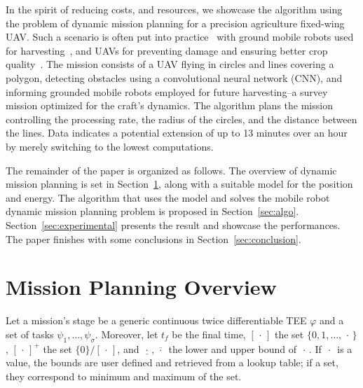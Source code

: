 \documentclass[letterpaper,10pt,conference]{ieeeconf}
\theoremstyle{definition}
\begin{document}
In the spirit of reducing costs, and resources, we showcase the algorithm using the problem of dynamic mission planning for a precision agriculture fixed-wing UAV. Such a scenario is often put into practice~\cite{hajjaj2014review} with ground mobile robots used for harvesting~\cite{qingchun2012study,dong2011development, de2011design, aljanobi2010setup, li2008analysis, edan2000robotic}, and UAVs for preventing damage and ensuring better crop quality~\cite{puri2017agriculture, daponte2019review}. The mission consists of a UAV flying in circles and lines covering a polygon, detecting obstacles using a convolutional neural network (CNN), and informing grounded mobile robots employed for future harvesting--a survey mission optimized for the craft's dynamics. The algorithm plans the mission controlling the processing rate, the radius of the circles, and the distance between the lines. Data indicates a potential extension of up to 13 minutes over an hour by merely switching to the lowest computations.

The remainder of the paper is organized as follows. The overview of dynamic mission planning is set in Section~\ref{sec:prob}, along with a suitable model for the position and energy. The algorithm that uses the model and solves the mobile robot dynamic mission planning problem is proposed in Section~\ref{sec:algo}. Section~\ref{sec:experimental} presents the result and showcase the performances. The paper finishes with some conclusions in Section~\ref{sec:conclusion}.


\section{Mission Planning Overview}
\label{sec:prob}

Let a mission's stage be a generic continuous twice differentiable TEE $\varphi$ and a set of tasks $\psi_1,\dots,\psi_{\sigma}$. Moreover, let $t_f$ be the final time, $[\,\cdot\,]$ the set $\{0,1,\dots,\,\cdot\,\}$, $[\,\cdot\,]^+$ the set $\{0\}/[\,\cdot\,]$, and $\underline{\,\cdot\,},\overline{\,\cdot\,}$ the lower and upper bound of $\,\cdot\,$. If $\,\cdot\,$ is a value, the bounds are user defined and retrieved from a lookup table; if a set, they correspond to minimum and maximum of the set.
\end{document}
